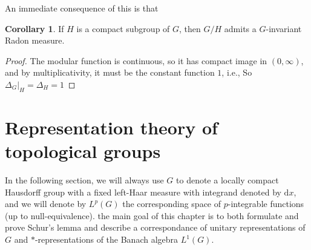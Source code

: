 \documentclass[10pt,twoside,openany,final]{memoir}
\theoremstyle{definition}
\newtheorem{corollary}[theorem]{Corollary}
\theoremstyle{Break}
\renewcommand{\d}{\mathrm{d}}
\begin{document}
An immediate consequence of this is that
\begin{corollary}
	If $H$ is a compact subgroup of $G$, then $G/H$ admits a $G$-invariant Radon measure.
\end{corollary}
\begin{proof}
	The modular function is continuous, so it has compact image in $(0,\infty)$, and by multiplicativity, it must be the constant function $1$, i.e., So $\Delta_G|_{H}=\Delta_H=1$
\end{proof}

\chapter{Representation theory of topological groups}
In the following section, we will always use $G$ to denote a locally compact Hausdorff group with a fixed left-Haar measure with integrand denoted by $\d x$, and we will denote by $L^p(G)$ the corresponding space of $p$-integrable functions (up to null-equivalence). the main goal of this chapter is to both formulate and prove Schur's lemma and describe a correspondance of unitary representations of $G$ and $*$-representations of the Banach algebra $L^1(G)$.
\end{document}
